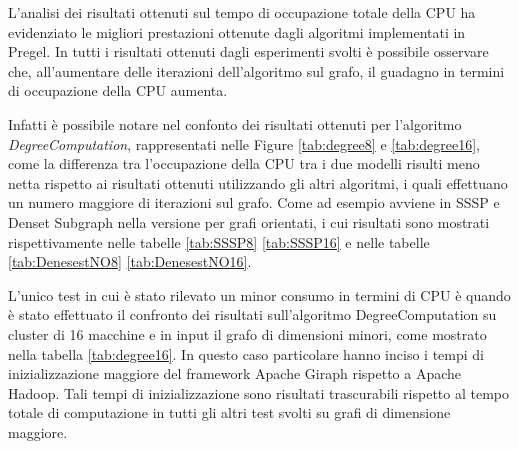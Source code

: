 \documentclass[LaM,binding=0.6cm]{sapthesis}
\begin{document}
L'analisi dei risultati ottenuti sul tempo di occupazione totale della CPU ha evidenziato le migliori prestazioni ottenute dagli algoritmi implementati in Pregel. 
In tutti i risultati ottenuti dagli esperimenti svolti è possibile osservare che, all'aumentare delle iterazioni dell'algoritmo sul grafo, il guadagno in termini di occupazione della CPU aumenta.

Infatti è possibile notare nel confonto dei risultati ottenuti per l'algoritmo \textit{DegreeComputation}, rappresentati nelle Figure \ref{tab:degree8} e \ref{tab:degree16}, come la differenza tra l'occupazione della CPU tra i due modelli risulti meno netta rispetto ai risultati ottenuti utilizzando gli altri algoritmi, i quali effettuano  un numero maggiore di iterazioni sul grafo. Come ad esempio avviene in SSSP e Denset Subgraph nella versione per grafi orientati, i cui risultati sono mostrati rispettivamente nelle tabelle \ref{tab:SSSP8} \ref{tab:SSSP16} e  nelle tabelle \ref{tab:DenesestNO8} \ref{tab:DenesestNO16}.

L'unico test in cui è stato rilevato un minor consumo in termini di CPU è quando è stato effettuato il confronto dei risultati sull'algoritmo  DegreeComputation su cluster di 16 macchine e in input il grafo di dimensioni minori, come mostrato nella tabella \ref{tab:degree16}. In questo caso particolare hanno inciso i tempi di inizializzazione maggiore del framework Apache Giraph rispetto a Apache Hadoop. Tali tempi di inizializzazione sono risultati trascurabili rispetto al tempo totale di computazione in tutti gli altri test svolti su  grafi di dimensione maggiore. 
\end{document}
